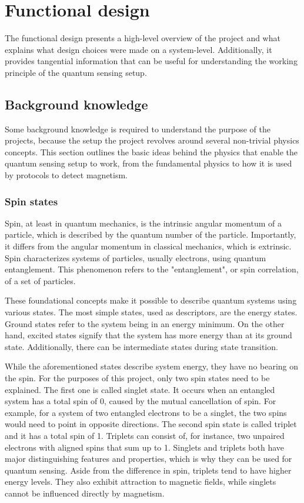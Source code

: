 \chapter{Functional design} \label{chap:func_design}
The functional design presents a high-level overview of the project and what explains what design choices were made on a system-level. Additionally, it provides tangential information that can be useful for understanding the working principle of the quantum sensing setup.

\section{Background knowledge}
Some background knowledge is required to understand the purpose of the projects, because the setup the project revolves around several non-trivial physics concepts. This section outlines the basic ideas behind the physics that enable the quantum sensing setup to work, from the fundamental physics to how it is used by protocols to detect magnetism.

\subsection{Spin states}
Spin, at least in quantum mechanics, is the intrinsic angular momentum of a particle, which is described by the quantum number of the particle. Importantly, it differs from the angular momentum in classical mechanics, which is extrinsic. Spin characterizes systems of particles, usually electrons, using quantum entanglement. This phenomenon refers to the "entanglement", or spin correlation, of a set of particles.

These foundational concepts make it possible to describe quantum systems using various states. The most simple states, used as descriptors, are the energy states. Ground states refer to the system being in an energy minimum. On the other hand, excited states signify that the system has more energy than at its ground state. Additionally, there can be intermediate states during state transition.

While the aforementioned states describe system energy, they have no bearing on the spin. For the purposes of this project, only two spin states need to be explained. The first one is called singlet state. It occurs when an entangled system has a total spin of 0, caused by the mutual cancellation of spin. For example, for a system of two entangled electrons to be a singlet, the two spins would need to point in opposite directions. The second spin state is called triplet and it has a total spin of 1. Triplets can consist of, for instance, two unpaired electrons with aligned spins that sum up to 1. Singlets and triplets both have major distinguishing features and properties, which is why they can be used for quantum sensing. Aside from the difference in spin, triplets tend to have higher energy levels. They also exhibit attraction to magnetic fields, while singlets cannot be influenced directly by magnetism.


